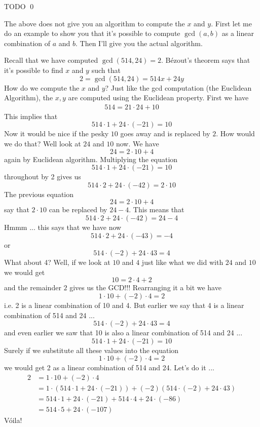 TODO
\qed

The above does not give you an algorithm to compute the
$x$ and $y$.
First let me do an example to show you that
it's possible to compute $\gcd(a,b)$ as a linear combination of $a$ and $b$.
Then I'll give you the actual algorithm.

Recall that we have computed $\gcd(514, 24) = 2$.
B\'ezout's theorem says that it's possible to find $x$ and $y$
such that
\[
2 = \gcd(514, 24) = 514x + 24y
\]
How do we compute the $x$ and $y$?
Just like the gcd computation (the Euclidean Algorithm),
the $x,y$ are computed using the Euclidean property.
First we have
\begin{align*}
514 = 21 \cdot 24 + 10
\end{align*}
This implies that 
\[
514 \cdot 1 + 24 \cdot (-21) = 10
\]
Now it would be nice if the pesky $10$ goes away and is replaced by
$2$.
How would we do that?
Well look at $24$ and $10$ now.
We have
\[
24 = 2 \cdot 10 + 4
\]
again by Euclidean algorithm.
Multiplying the equation
\[
514 \cdot 1 + 24 \cdot (-21) = 10
\]
throughout by 2 gives us
\[
514 \cdot 2 + 24 \cdot (-42) = 2 \cdot 10
\]
The previous equation
\[
24 = 2 \cdot 10 + 4
\]
say that $2 \cdot 10$ can be replaced by $24 - 4$.
This means that
\[
514 \cdot 2 + 24 \cdot (-42) = 24 - 4
\]
Hmmm ... this says that we have now
\[
514 \cdot 2 + 24 \cdot (-43) = -4
\]
or
\[
514 \cdot (-2) + 24 \cdot 43 = 4
\]
What about 4?
Well, if we look at $10$ and $4$ just like what we did with $24$ and $10$
we would get
\[
10 = 2 \cdot 4 + 2
\]
and the remainder $2$ gives us the GCD!!!
Rearranging it a bit we have
\[
1 \cdot 10 + (-2) \cdot 4 = 2
\]
i.e. 2 is a linear combination of 10 and 4.
But earlier we say that 4 is a linear combination of 514 and 24 ...
\[
514 \cdot (-2) + 24 \cdot 43 = 4
\]
and even earlier we saw that 10 is also a linear combination of 514 and 24 ...
\[
514 \cdot 1 + 24 \cdot (-21) = 10
\]
Surely if we substitute all these values into the equation
\[
1 \cdot 10 + (-2) \cdot 4 = 2
\]
we would get 2 as a linear combination of 514 and 24.
Let's do it ...
\begin{align*}
2 
&= 1 \cdot 10 + (-2) \cdot 4 \\
&= 1 \cdot (514 \cdot 1 + 24 \cdot (-21)) + (-2) (514 \cdot (-2) + 24 \cdot 43) \\
&= 514 \cdot 1 + 24 \cdot (-21) + 514 \cdot 4 + 24 \cdot (-86) \\
&= 514 \cdot 5 + 24 \cdot (-107)
\end{align*}
V\'oila!

